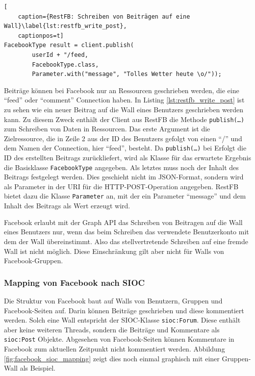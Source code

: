 \begin{lstlisting}[
    caption={RestFB: Schreiben von Beiträgen auf eine Wall}\label{lst:restfb_write_post},
    captionpos=t]
FacebookType result = client.publish(
        userId + "/feed,
        FacebookType.class,
        Parameter.with("message", "Tolles Wetter heute \o/"));
\end{lstlisting}

Beiträge können bei Facebook nur an Ressourcen geschrieben werden, die eine \enquote{feed} oder \enquote{comment} Connection haben. In Listing \ref{lst:restfb_write_post} ist zu sehen wie ein neuer Beitrag auf die Wall eines Benutzers geschrieben werden kann. Zu diesem Zweck enthält der Client aus RestFB die Methode \texttt{publish(\dots)} zum Schreiben von Daten in Ressourcen. Das erste Argument ist die Zielressource, die in Zeile 2 aus der ID des Benutzers gefolgt von einen \enquote{/} und dem Namen der Connection, hier \enquote{feed}, besteht. Da \texttt{publish(\dots)} bei Erfolgt die ID des erstellten Beitrags zurückliefert, wird als Klasse für das erwartete Ergebnis die Basisklasse \texttt{FacebookType} angegeben. Als letztes muss noch der Inhalt des Beitrags festgelegt werden. Dies geschieht nicht im JSON-Format, sondern wird als Parameter in der URI für die HTTP-POST-Operation angegeben. RestFB bietet dazu die Klasse \texttt{Parameter} an, mit der ein Parameter \enquote{message} und dem Inhalt des Beitrags als Wert erzeugt wird.

Facebook erlaubt mit der Graph API das Schreiben von Beitragen auf die Wall eines Benutzers nur, wenn das beim Schreiben das verwendete Benutzerkonto mit dem der Wall übereinstimmt. Also das stellvertretende Schreiben auf eine fremde Wall ist nicht möglich. Diese Einschränkung gilt aber nicht für Walls von Facebook-Gruppen.


\subsubsection{Mapping von Facebook nach SIOC} %
\label{ssub:facebook_mapping_nach_sioc}

Die Struktur von Facebook baut auf Walls von Benutzern, Gruppen und Facebook-Seiten auf. Darin können Beiträge geschrieben und diese kommentiert werden. Solch eine Wall entspricht der SIOC-Klasse \texttt{sioc:Forum}. Diese enthält aber keine weiteren Threads, sondern die Beiträge und Kommentare als \texttt{sioc:Post} Objekte. Abgesehen von Facebook-Seiten können Kommentare in Facebook zum aktuellen Zeitpunkt nicht kommentiert werden. Abbildung \ref{fig:facebook_sioc_mapping} zeigt dies noch einmal graphisch mit einer Gruppen-Wall als Beispiel.

